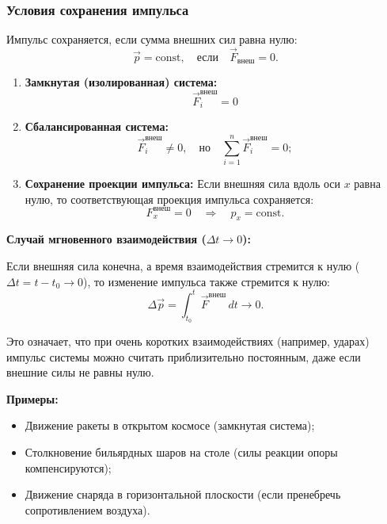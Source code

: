 \subsubsection*{Условия сохранения импульса}

Импульс сохраняется, если сумма внешних сил равна нулю:
\[
\vec{p} = \text{const}, \quad \text{если} \quad \vec{F}_{\text{внеш}} = 0.
\]

\begin{enumerate}
	\item \textbf{Замкнутая (изолированная) система:}
	\[
	\vec{F}_i^{\text{внеш}} = 0
	\]
	\item \textbf{Сбалансированная система:}
	\[
	\vec{F}_i^{\text{внеш}} \neq 0, \quad \text{но} \quad \sum_{i=1}^n \vec{F}_i^{\text{внеш}} = 0;
	\]
	\item \textbf{Сохранение проекции импульса:} Если внешняя сила вдоль оси $x$ равна нулю, то соответствующая проекция импульса сохраняется:
	\[
	F_x^{\text{внеш}} = 0 \quad \Rightarrow \quad p_x = \text{const}.
	\]
\end{enumerate}

\textbf{Случай мгновенного взаимодействия ($\Delta t \to 0$):}

Если внешняя сила конечна, а время взаимодействия стремится к нулю ($\Delta t = t - t_0 \to 0$), то изменение импульса также стремится к нулю:
\[
\Delta \vec{p} = \int_{t_0}^{t} \vec{F}^{\text{внеш}} \, dt \to 0.
\]

Это означает, что при очень коротких взаимодействиях (например, ударах) импульс системы можно считать приблизительно постоянным, даже если внешние силы не равны нулю.

\textbf{Примеры:}
\begin{itemize}
		\item Движение ракеты в открытом космосе (замкнутая система);
		\item Столкновение бильярдных шаров на столе (силы реакции опоры компенсируются);
		\item Движение снаряда в горизонтальной плоскости (если пренебречь сопротивлением воздуха).
\end{itemize}